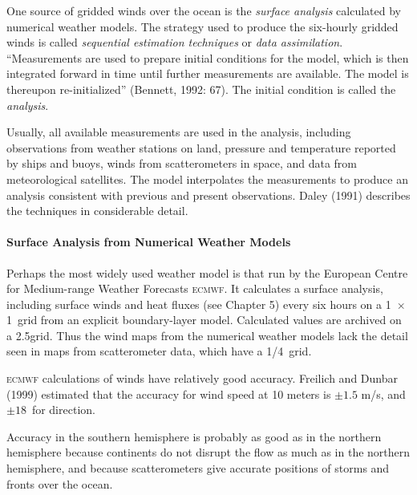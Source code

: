 One source of gridded winds over the ocean is the \textit{surface analysis}
calculated by numerical weather models. The strategy
used to produce the six-hourly gridded winds is called \textit{sequential estimation techniques}
or
\textit{data assimilation}. ``Measurements are used
to prepare initial conditions for the model, which is then integrated forward in
time until further measurements are available. The model is thereupon
re-initialized'' (Bennett, 1992: 67). The initial condition is called the \textit{analysis}.

Usually, all available measurements are used in the analysis, including observations from
weather stations on land, pressure and temperature reported by ships and buoys, winds
from scatterometers in space, and data
from meteorological satellites. The model interpolates the measurements to produce an analysis
consistent with previous and present observations. Daley (1991) describes the techniques in
considerable detail.

\paragraph{Surface Analysis from Numerical Weather Models}
Perhaps the most widely used weather model is that run by the European Centre for Medium-range
Weather Forecasts \textsc{ecmwf}. It calculates a surface analysis,
including surface winds and heat fluxes (see Chapter 5) every six hours on a
1\degrees\ $
\times $ 1\degrees\ grid from an explicit boundary-layer model. Calculated
values are archived on a 2.5\degrees grid. Thus the wind maps from the numerical weather
models lack the detail seen in maps from scatterometer data, which have a
1/4\degrees\  grid.

\textsc{ecmwf} calculations of winds have relatively good
accuracy. Freilich and Dunbar (1999) estimated that
the accuracy for wind speed at 10 meters is
$\pm 1.5$ m/s, and $\pm 18$\degrees\ for direction. 

Accuracy in the southern hemisphere is probably as good as in the northern
hemisphere because continents do not disrupt the flow as much as in the northern
hemisphere, and because scatterometers give accurate positions of storms
and fronts over the ocean.

